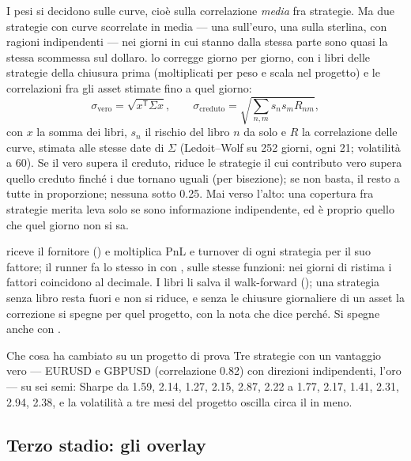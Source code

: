 I pesi si decidono sulle curve, cioè sulla correlazione \emph{media} fra
strategie. Ma due strategie con curve scorrelate in media --- una sull'euro,
una sulla sterlina, con ragioni indipendenti --- nei giorni in cui stanno
dalla stessa parte sono quasi la stessa scommessa sul dollaro.
 lo corregge giorno per giorno, con i libri
delle strategie della chiusura prima (moltiplicati per peso e scala nel
progetto) e le correlazioni fra gli asset stimate fino a quel giorno:
\[
  \sigma_{\text{vero}} = \sqrt{x^{\mathsf T}\Sigma x},
  \qquad
  \sigma_{\text{creduto}} = \sqrt{\textstyle\sum_{n,m} s_n s_m R_{nm}},
\]
con $x$ la somma dei libri, $s_n$ il rischio del libro $n$ da solo e $R$ la
correlazione delle curve, stimata alle stesse date di $\Sigma$ (Ledoit--Wolf
su 252 giorni, ogni 21; volatilità a 60). Se il vero supera il creduto,
 riduce le strategie il cui contributo vero supera
quello creduto finché i due tornano uguali (per bisezione); se non basta, il
resto a tutte in proporzione; nessuna sotto \num{0.25}. Mai verso l'alto: una
copertura fra strategie merita leva solo se sono informazione indipendente, ed
è proprio quello che quel giorno non si sa.

 riceve il fornitore () e moltiplica PnL
e turnover di ogni strategia per il suo fattore; il runner fa lo stesso in
 con , sulle stesse
funzioni: nei giorni di ristima i fattori coincidono al decimale. I libri li
salva il walk-forward (); una strategia
senza libro resta fuori e non si riduce, e senza le chiusure giornaliere di un
asset la correzione si spegne per quel progetto, con la nota che dice perché.
Si spegne anche con .

\begin{nota}{Che cosa ha cambiato su un progetto di prova}
Tre strategie con un vantaggio vero --- EURUSD e GBPUSD (correlazione
\num{0.82}) con direzioni indipendenti, l'oro --- su sei semi: Sharpe da
\num{1.59}, \num{2.14}, \num{1.27}, \num{2.15}, \num{2.87}, \num{2.22} a
\num{1.77}, \num{2.17}, \num{1.41}, \num{2.31}, \num{2.94}, \num{2.38}, e la
volatilità a tre mesi del progetto oscilla circa il  in meno.
\end{nota}

\subsection{Terzo stadio: gli overlay}

